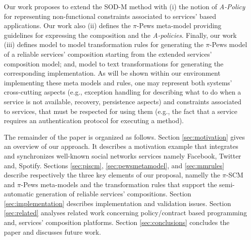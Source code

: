 {Our work proposes to extend the SOD-M \cite{decastro1} method with  (i)  the notion of {\em A-Policy} \cite{Espinosa-Oviedo2011a} for representing non-functional constraints associated to services' based applications.  
Our work  also (ii) defines the $\pi$-{\sc Pews}  meta-model \cite{Placido2010LTPD} providing guidelines for expressing the composition and the {\em A-policies}. Finally, our work (iii) defines model to model transformation rules for generating the $\pi$-{\sc Pews} model of a reliable services' composition starting from the extended services' composition model; and, model to text transformations for generating the corresponding implementation. As will be shown within our environment implementing these meta models and rules, one may represent both systems' cross-cutting aspects (e.g., exception handling for describing what to do when a service is not available, recovery, persistence aspects) and constraints associated to services, that must be respected for using them (e.g., the fact that a service requires an authentication protocol for executing a method). 

The remainder of the paper is organized as follows. Section \ref{sec:motivation} gives an overview of our approach. It describes a motivation example that integrates and synchronizes well-known social networks services namely Facebook, Twitter and, Spotify. Sections \ref{sec:piscm}, \ref{sec:pewsmetamodel}, and \ref{sec:mmrules} describe respectively the three key elements of our proposal, namelly the $\pi$-SCM and $\pi$-{\sc Pews} meta-models and the transformation rules that support the semi-automatic generation of reliable services' compositions.
%
Section \ref{sec:implementation} describes implementation and validation issues.
Section \ref{sec:related} analyses related work concerning policy/contract based programming and, services' composition platforms. Section \ref{sec:conclusions} concludes the paper and discusses future work.

}

